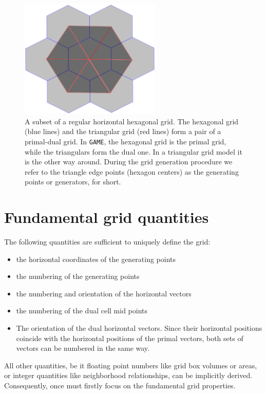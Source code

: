 \documentclass[10pt]{report}
\begin{document}
\begin{figure}
\begin{center}
\includegraphics[width = 0.6\textwidth]{hexagonal_grid_0.pdf}
\caption{A subset of a regular horizontal hexagonal grid. The hexagonal grid (blue lines) and the triangular grid (red lines) form a pair of a primal-dual grid. In \texttt{GAME}, the hexagonal grid is the primal grid, while the triangulars form the dual one. In a triangular grid model it is the other way around. During the grid generation procedure we refer to the triangle edge points (hexagon centers) as the generating points or generators, for short.}
\label{fig:hexagonal_grid_0}
\end{center}
\end{figure}

\section{Fundamental grid quantities}
\label{sec:fundamental_grid_quantities}

The following quantities are sufficient to uniquely define the grid:

\begin{itemize}
\item the horizontal coordinates of the generating points
\item the numbering of the generating points
\item the numbering and orientation of the horizontal vectors
\item the numbering of the dual cell mid points
\item The orientation of the dual horizontal vectors. Since their horizontal positions coincide with the horizontal positions of the primal vectors, both sets of vectors can be numbered in the same way.
\end{itemize}
%
All other quantities, be it floating point numbers like grid box volumes or areas, or integer quantities like neighborhood relationships, can be implicitly derived. Consequently, once must firstly focus on the fundamental grid properties.
\end{document}
